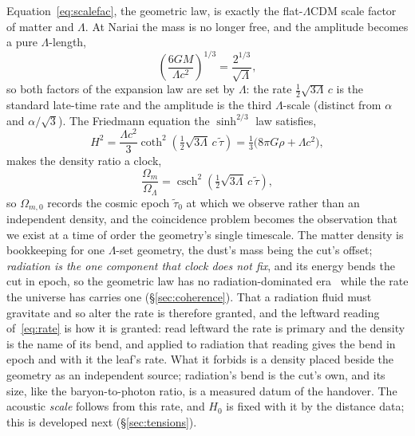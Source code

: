 \documentclass[11pt,a4paper]{article}
\theoremstyle{plain}
\theoremstyle{definition}
\theoremstyle{remark}
\begin{document}
Equation~\eqref{eq:scalefac}, the geometric law, is exactly the flat-$\Lambda$CDM scale factor of matter and $\Lambda$. At Nariai the mass is no longer free, and the amplitude becomes a pure $\Lambda$-length,
\begin{equation}
\left(\frac{6GM}{\Lambda c^2}\right)^{1/3}=\frac{2^{1/3}}{\sqrt\Lambda},
\label{eq:amplitude}
\end{equation}
so both factors of the expansion law are set by $\Lambda$: the rate $\tfrac12\sqrt{3\Lambda}\,c$ is the standard late-time rate and the amplitude is the third $\Lambda$-scale (distinct from $\alpha$ and $\alpha/\sqrt3$). The Friedmann equation the $\sinh^{2/3}$ law satisfies,
\begin{equation}
H^2=\frac{\Lambda c^2}{3}\coth^2\!\left(\tfrac12\sqrt{3\Lambda}\,c\,\tilde\tau\right)=\tfrac13\bigl(8\pi G\rho+\Lambda c^2\bigr),
\label{eq:rate}
\end{equation}
makes the density ratio a clock,
\begin{equation}
\frac{\Omega_m}{\Omega_\Lambda}=\operatorname{csch}^2\!\left(\tfrac12\sqrt{3\Lambda}\,c\,\tilde\tau\right),
\label{eq:omega-ratio}
\end{equation}
so $\Omega_{m,0}$ records the cosmic epoch $\tilde\tau_0$ at which we observe rather than an independent density, and the coincidence problem becomes the observation that we exist at a time of order the geometry's single timescale. The matter density is bookkeeping for one $\Lambda$-set geometry, the dust's mass being the cut's offset; \emph{radiation is the one component that clock does not fix}, and its energy bends the cut in epoch, so the geometric law has no radiation-dominated era~\cite{JanzenModernParallax} while the rate the universe has carries one (\S\ref{sec:coherence}). That a radiation fluid must gravitate and so alter the rate is therefore granted, and the leftward reading of~\eqref{eq:rate} is how it is granted: read leftward the rate is primary and the density is the name of its bend, and applied to radiation that reading gives the bend in epoch and with it the leaf's rate. What it forbids is a density placed beside the geometry as an independent source; radiation's bend is the cut's own, and its size, like the baryon-to-photon ratio, is a measured datum of the handover. The acoustic \emph{scale} follows from this rate, and $H_0$ is fixed with it by the distance data; this is developed next (\S\ref{sec:tensions}).
\end{document}
